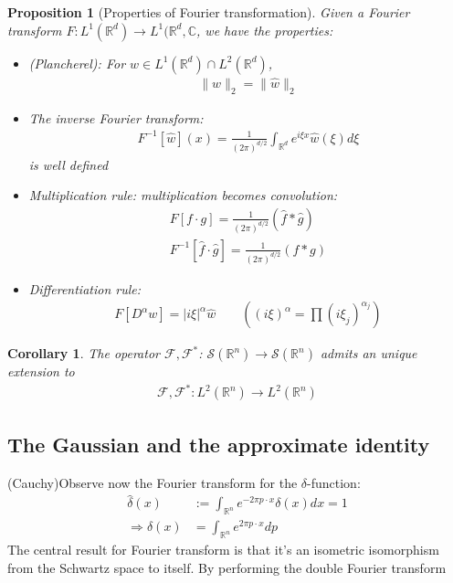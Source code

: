 \documentclass[a4paper,11pt,fleqn]{book}
\newtheorem{corollary}{Corollary}[theorem]
\newtheorem{proposition}[theorem]{Proposition}
\theoremstyle{definition}
\theoremstyle{remark}
\begin{document}
\begin{proposition}[Properties of Fourier transformation]
Given a Fourier transform $F: L^1(\mathbb{R}^d) \rightarrow L^1(\mathbb{R}^d, \mathbb{C}$, we have the properties:
\begin{itemize}
	\item (Plancherel): For $w \in L^1(\mathbb{R}^d) \cap L^2(\mathbb{R}^d)$, 
	\begin{align*}
		\|w\|_2 = \|\hat{w}\|_2
	\end{align*}
	\item The inverse Fourier transform:
	\begin{align*}
		F^{-1}[\hat{w}](x) =\frac{1}{(2\pi)^{d/2}} \int_{\mathbb{R}^d}
		e^{i \xi x} \hat{w}(\xi) d\xi 
	\end{align*}
	is well defined
	\item Multiplication rule: multiplication becomes convolution:
	\begin{align*}
		F[f \cdot g] = \frac{1}{(2\pi)^{d/2}} (\hat{f}* \hat{g})\\
		F^{-1}[\hat{f} \cdot \hat{g}] = \frac{1}{(2\pi)^{d/2}} (f * g)
	\end{align*}
	\item Differentiation rule: 
	\begin{align*}
		F[D^\alpha w ] = |i \xi|^\alpha \hat{w} \qquad
		((i\xi)^\alpha = \prod (i \xi_j)^{\alpha_j})
	\end{align*}
\end{itemize}
\end{proposition}

\begin{corollary}
	The operator $\mathcal{F}, \mathcal{F}^*$: $\mathcal{S}(\mathbb{R}^n) \rightarrow \mathcal{S}(\mathbb{R}^n)$ admits an unique extension to 
	\begin{align*}
		\mathcal{F}, \mathcal{F}^*: L^2(\mathbb{R}^n) \rightarrow L^2(\mathbb{R}^n)
	\end{align*}
\end{corollary}

\subsection{The Gaussian and the approximate identity}
(Cauchy)Observe now the Fourier transform for the $\delta$-function:
\begin{align*}
	\hat{\delta}(x) &:= \int_{\mathbb{R}^n} e^{-2\pi p\cdot x}\delta(x)dx = 1\\
	\Rightarrow \delta(x) &= \int_{\mathbb{R}^n} e^{2 \pi p \cdot x} dp
\end{align*}
The central result for Fourier transform is that it's an isometric isomorphism from the Schwartz space to itself. By performing the double Fourier transform 
\end{document}

